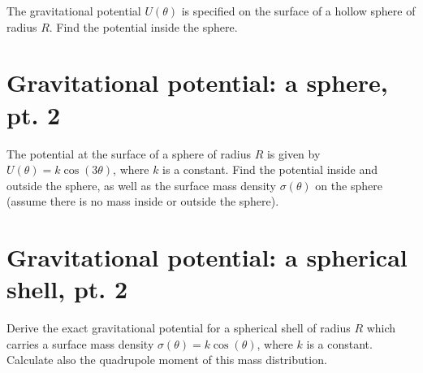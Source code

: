 \documentclass[a4paper, 11pt, oneside]{impression}
\begin{document}
\begin{exercise}{}
    The gravitational potential $U(\theta)$ is specified on the surface of a hollow sphere of radius $R$. Find the potential inside the sphere.
\end{exercise}



\newpage

\chapter{Gravitational potential: a sphere, pt. 2}\label{quest: five}

\begin{exercise}{}
    The potential at the surface of a sphere of radius $R$ is given by $U(\theta) = k\cos(3\theta)$, where $k$ is a constant. Find the potential inside and outside the sphere, as well as the surface mass density $\sigma(\theta)$ on the sphere (assume there is no mass inside or outside the sphere).
\end{exercise}



\newpage

\chapter{Gravitational potential: a spherical shell, pt. 2}\label{quest: six}

\begin{exercise}{}
    Derive the exact gravitational potential for a spherical shell of radius $R$ which carries a surface mass density $\sigma(\theta) = k\cos(\theta)$, where $k$ is a constant. Calculate also the quadrupole moment of this mass distribution.
\end{exercise}



\end{document}

